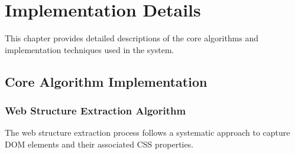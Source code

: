 \chapter{Implementation Details}
\label{chap:implementation}

This chapter provides detailed descriptions of the core algorithms and implementation techniques used in the {\name} system.

\section{Core Algorithm Implementation}
\label{sec:core_algorithms}

\subsection{Web Structure Extraction Algorithm}

The web structure extraction process follows a systematic approach to capture DOM elements and their associated CSS properties.


